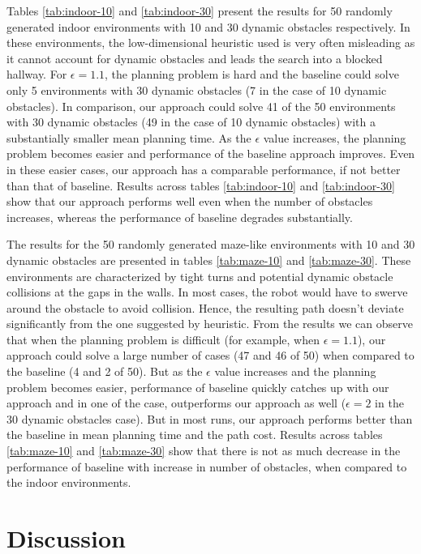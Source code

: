 Tables \ref{tab:indoor-10} and \ref{tab:indoor-30} present the results for 50 randomly generated indoor environments with 10 and 30 dynamic obstacles respectively. In these environments, the low-dimensional heuristic used is very often misleading as it cannot account for dynamic obstacles and leads the search into a blocked hallway. For $\epsilon=1.1$, the planning problem is hard and the baseline could solve only 5 environments with 30 dynamic obstacles (7 in the case of 10 dynamic obstacles). In comparison, our approach could solve 41 of the 50 environments with 30 dynamic obstacles (49 in the case of 10 dynamic obstacles) with a substantially smaller mean planning time. As the $\epsilon$ value increases, the planning problem becomes easier and performance of the baseline approach improves. Even in these easier cases, our approach has a comparable performance, if not better than that of baseline. Results across tables \ref{tab:indoor-10} and \ref{tab:indoor-30} show that our approach performs well even when the number of obstacles increases, whereas the performance of baseline degrades substantially.

The results for the 50 randomly generated maze-like environments with 10 and 30 dynamic obstacles are presented in tables \ref{tab:maze-10} and \ref{tab:maze-30}. These environments are characterized by tight turns and potential dynamic obstacle collisions at the gaps in the walls. In most cases, the robot would have to swerve around the obstacle to avoid collision. Hence, the resulting path doesn't deviate significantly from the one suggested by heuristic. From the results we can observe that when the planning problem is difficult (for example, when $\epsilon = 1.1$), our approach could solve a large number of cases (47 and 46 of 50) when compared to the baseline (4 and 2 of 50). But as the $\epsilon$ value increases and the planning problem becomes easier, performance of baseline quickly catches up with our approach and in one of the case, outperforms our approach as well ($\epsilon=2$ in the 30 dynamic obstacles case). But in most runs, our approach performs better than the baseline in mean planning time and the path cost. Results across tables \ref{tab:maze-10} and \ref{tab:maze-30} show that there is not as much decrease in the performance of baseline with increase in number of obstacles, when compared to the indoor environments.

\section{Discussion}
\label{sec:discussion}

